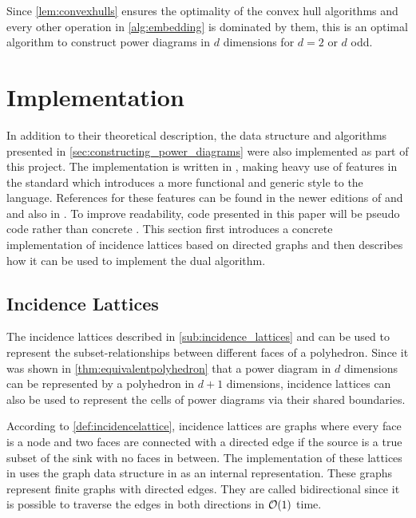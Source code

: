 Since \cref{lem:convexhulls} ensures the optimality of the convex hull algorithms and every other operation in \cref{alg:embedding} is dominated by them, this is an optimal algorithm to construct power diagrams in $d$ dimensions for $d = 2$ or $d$ odd.

\section{Implementation}
\label{sec:implementation}
In addition to their theoretical description, the data structure and algorithms presented in \cref{sec:constructing_power_diagrams} were also implemented as part of this project.
The implementation is written in \CC, making heavy use of features in the \CCe standard which introduces a more functional and generic style to the language.
References for these features can be found in the newer editions of \cite{stroustrup1986c++} and \cite{stroustrup2014programming} and also in \cite{meyers2014effective}.
To improve readability, code presented in this paper will be pseudo code rather than concrete \CC.
This section first introduces a concrete implementation of incidence lattices based on directed graphs and then describes how it can be used to implement the dual algorithm.

\subsection{Incidence Lattices}
\label{sub:impl_incidence_lattices}
The incidence lattices described in \cref{sub:incidence_lattices} and \cite{edelsbrunner1986constructing} can be used to represent the subset-relationships between different faces of a polyhedron.
Since it was shown in \cref{thm:equivalentpolyhedron} that a power diagram in $d$ dimensions can be represented by a polyhedron in $d+1$ dimensions, incidence lattices can also be used to represent the cells of power diagrams via their shared boundaries.

According to \cref{def:incidencelattice}, incidence lattices are graphs where every face is a node and two faces are connected with a directed edge if the source is a true subset of the sink with no faces in between.
The implementation of these lattices in  uses the graph data structure in  as an internal representation.
These graphs represent finite graphs with directed edges.
They are called bidirectional since it is possible to traverse the edges in both directions in $\mathcal{O}(1)$ time.


